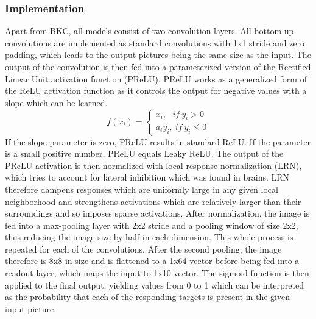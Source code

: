 \subsubsection{Implementation}
Apart from BKC, all models consist of two convolution layers. All bottom up convolutions are implemented as standard convolutions with 1x1 stride and zero padding, which leads to the output pictures being the same size as the input. The output of the convolution is then fed into a parameterized version of the Rectified Linear Unit activation function (PReLU). PReLU works as a generalized form of the ReLU activation function as it controls the output for negative values with a slope which can be learned. $$f(x_i) = \begin{cases}
x_i,\ \ \ if\ y_i > 0\\    
a_iy_i,\ if\ y_i \leq 0
\end{cases}$$ If the slope parameter is zero, PReLU results in standard ReLU. If the parameter is a small positive number, PReLU equals Leaky ReLU. The output of the PReLU activation is then normalized with local response normalization (LRN), which tries to account for lateral inhibition which was found in brains. LRN therefore dampens responses which are uniformly large in any given local neighborhood and strengthens activations which are relatively larger than their surroundings and so imposes sparse activations. After normalization, the image is fed into a max-pooling layer with 2x2 stride and a pooling window of size 2x2, thus reducing the image size by half in each dimension. This whole process is repeated for each of the convolutions. After the second pooling, the image therefore is 8x8 in size and is flattened to a 1x64 vector before being fed into a readout layer, which maps the input to {\tiny }1x10 vector. The sigmoid function is then applied to the final output, yielding values from 0 to 1 which can be interpreted as the probability that each of the responding targets is present in the given input picture.
\\
